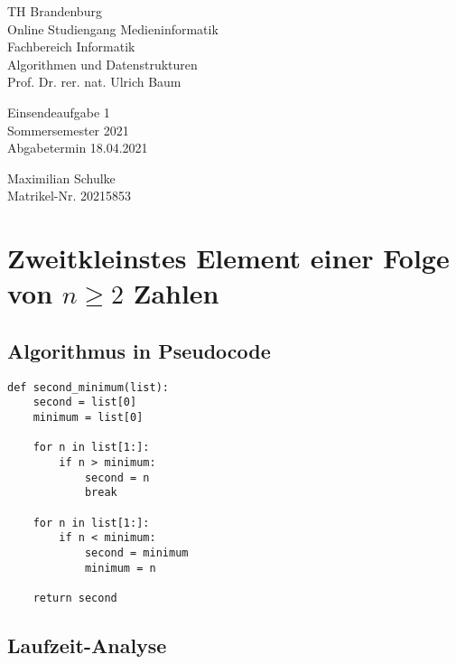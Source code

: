 \documentclass{article}
\begin{document}
\begin{titlepage}
	\begin{flushleft}
		TH Brandenburg \\
		Online Studiengang Medieninformatik \\
		Fachbereich Informatik \\
		Algorithmen und Datenstrukturen \\
		Prof. Dr. rer. nat. Ulrich Baum
	\end{flushleft}

	\vfill

	\begin{center}
		\Large{Einsendeaufgabe 1}\\[0.5em]
		\large{Sommersemester 2021}\\[0.25em]
		\large{Abgabetermin 18.04.2021}
	\end{center}

	\vfill

	\begin{flushright}
		Maximilian Schulke \\
		Matrikel-Nr. 20215853
	\end{flushright}
\end{titlepage}

\newpage

\section{Zweitkleinstes Element einer Folge  von $n \geq 2$ Zahlen}

\subsection{Algorithmus in Pseudocode}

\begin{lstlisting}
def second_minimum(list):
    second = list[0]
    minimum = list[0]

    for n in list[1:]:
        if n > minimum:
            second = n
            break

    for n in list[1:]:
        if n < minimum:
            second = minimum
            minimum = n

    return second
\end{lstlisting}

\subsection{Laufzeit-Analyse}
\end{document}
